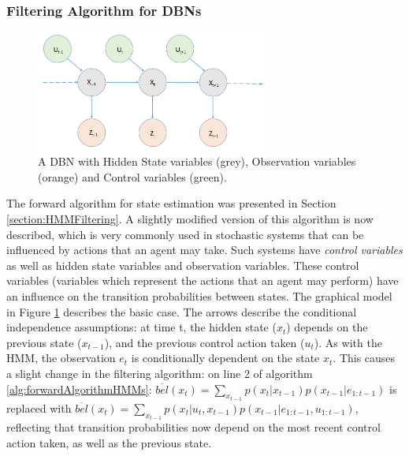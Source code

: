 \subsubsection{Filtering Algorithm for DBNs}\label{subsubsec:filteringDBN}
\begin{figure}
    \centering
    \includegraphics[width = 0.68\textwidth]{Chapters/BackgroundKnowledgeAndRelatedWork/MultiAgentTargetDetectionBackground/Figs/HMMs/HMMWithControl.png}
    \caption{A DBN with Hidden State variables (grey), Observation variables (orange) and Control variables (green).}
    \label{fig:HMMWithControlVariablesExample}
\end{figure}
The forward algorithm for state estimation was presented in Section \ref{section:HMMFiltering}. A slightly modified version of this algorithm is now described, which is very commonly used in stochastic systems that can be influenced by actions that an agent may take. Such systems have \textit{control variables} as well as hidden state variables and observation variables. These control variables (variables which represent the actions that an agent may perform) have an influence on the transition probabilities between states. The graphical model in Figure \ref{fig:HMMWithControlVariablesExample} describes the basic case. The arrows describe the conditional independence assumptions: at time t, the hidden state ($x_t$) depends on the previous state ($x_{t-1}$), and the previous control action taken ($u_t$). As with the HMM, the observation $e_t$ is conditionally dependent on the state $x_t$. This causes a slight change in the filtering algorithm: on line 2 of algorithm \ref{alg:forwardAlgorithmHMMs}: $\overline{bel}(x_t) = \sum_{x_{t-1}} p(x_t | x_{t-1}) p(x_{t-1} | e_{1:t-1}) $ is replaced with $\overline{bel}(x_t) = \sum_{x_{t-1}} p(x_t | u_t, x_{t-1}) p(x_{t-1} | e_{1:t-1}, u_{1:t-1})$, reflecting that transition probabilities now depend on the most recent control action taken, as well as the previous state.





